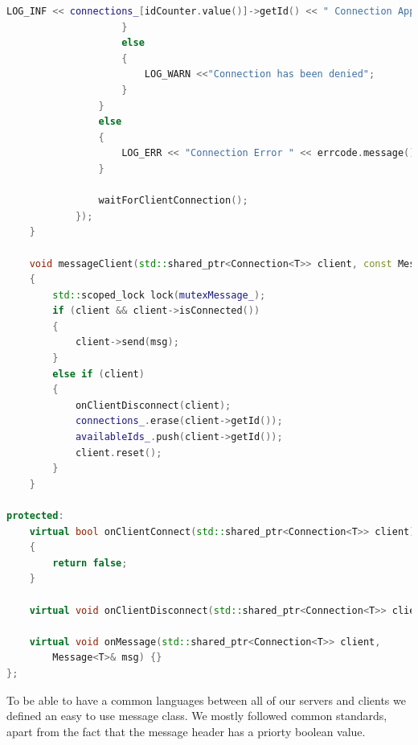 \documentclass[17pt]{article}
\begin{document}
\begin{lstlisting}[language = C++]
                        LOG_INF << connections_[idCounter.value()]->getId() << " Connection Approved";
                    }
                    else
                    {
                        LOG_WARN <<"Connection has been denied";
                    }
                }
                else
                {
                    LOG_ERR << "Connection Error " << errcode.message();
                }
        
                waitForClientConnection();
            });
    }

    void messageClient(std::shared_ptr<Connection<T>> client, const Message<T>& msg)
    {
        std::scoped_lock lock(mutexMessage_);
        if (client && client->isConnected())
        {
            client->send(msg);
        }
        else if (client)
        {
            onClientDisconnect(client);
            connections_.erase(client->getId());
            availableIds_.push(client->getId());
            client.reset();
        }
    }

protected:
    virtual bool onClientConnect(std::shared_ptr<Connection<T>> client)
    {
        return false;
    }

    virtual void onClientDisconnect(std::shared_ptr<Connection<T>> client) {}

    virtual void onMessage(std::shared_ptr<Connection<T>> client,
        Message<T>& msg) {}
};
\end{lstlisting}

\indent \indent
To be able to have a common languages between all of our servers and clients
we defined an easy to use message class. We mostly followed common standards,
apart from the fact that the message header has a priorty boolean value.
\end{document}

